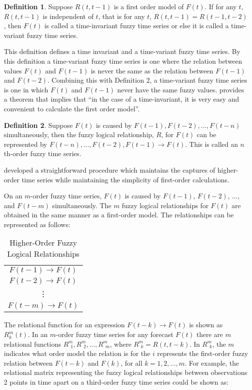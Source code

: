 \documentclass{article}
\theoremstyle{definition}
\newtheorem{ftsdef}{Definition}
\begin{document}
\begin{ftsdef}
Suppose $R(t,t-1)$ is a first order model of $F(t)$. If for any $t$, $R(t,t-1)$ is independent of $t$, that is for any $t$, $R(t,t-1) = R(t-1,t-2)$, then $F(t)$ is called a time-invariant fuzzy time series or else it is called a time-variant fuzzy time series.
\end{ftsdef}

This definition defines a time invariant and a time-variant fuzzy time series. By this definition a time-variant fuzzy time series is one where the relation between values $F(t)$ and $F(t-1)$ is never the same as the relation between $F(t-1)$ and $F(t-2)$. Combining this with Definition 2, a time-variant fuzzy time series is one in which $F(t)$ and $F(t-1)$ never have the same fuzzy values. \cite{song1993forecasting} provides a theorem that implies that ``in the case of a time-invariant, it is very easy and convenient to calculate the first order model''.


\begin{ftsdef}
Suppose $F(t)$ is caused by $F(t-1),F(t-2),\ldots,F(t-n)$ simultaneously, then the fuzzy logical relationship, $R$, for $F(t)$ can be represented by $F(t-n),\ldots, F(t-2),F(t-1) \rightarrow F(t)$. This is called an $n$th-order fuzzy time series.
\end{ftsdef}

\cite{tsai1999study} developed a straightforward procedure which maintains the captures of higher-order time series while maintaining the simplicity of first-order calculations.

On an $m$-order fuzzy time series, $F(t)$ is caused by $F(t-1)$, $F(t-2)$, $\ldots$, and $F(t-m)$ simultaneously. The $m$ fuzzy logical relationships for $F(t)$ are obtained in the same manner as a first-order model. The relationships can be represented as follows:

\begin{table}[H]
	\center
	\begin{tabular}{ c }
  	$F(t-1) \rightarrow F(t)$ \\
  	$F(t-2) \rightarrow F(t)$ \\
  	\vdots \\
  	$F(t-m) \rightarrow F(t)$ \\
	\end{tabular}
	\caption{Higher-Order Fuzzy Logical Relationships}
\end{table}

The relational function for an expression $F(t-k) \rightarrow F(t)$ is shown as $R^{m}_{k}(t)$. In an $m$-order fuzzy time series for any forecast $F(t)$ there are $m$ relational functions $R^{m}_{\ \ 1}, R^{m}_{\ \ 2}, \ldots, R^{m}_{\ \ m}$, where $R^{m}_{\ \ k}=R(t,t-k)$. In $R^{m}_{\ \ k}$, the $m$ indicates what order model the relation is for the $i$ represents the first-order fuzzy relation between $F(t-k)$ and $F(k)$, for all $k={1,2,\ldots,m}$. For example, the relational matrix representing the fuzzy logical relationships between observations 2 points in time apart on a third-order fuzzy time series could be shown as:
\end{document}
